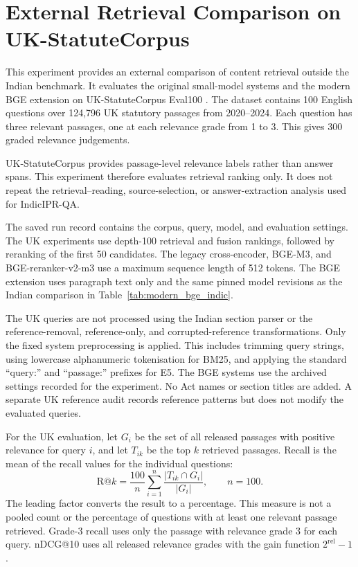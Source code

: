 \documentclass[pdflatex,sn-basic]{sn-jnl}%
\theoremstyle{thmstyleone}%
\theoremstyle{thmstyletwo}%
\theoremstyle{thmstylethree}%
\begin{document}
\FloatBarrier

\section{External Retrieval Comparison on UK-StatuteCorpus}
\label{sec:uk_external_validation}

This experiment provides an external comparison of content retrieval outside
the Indian benchmark. It evaluates the original small-model systems and the
modern BGE extension on UK-StatuteCorpus Eval100
\citep{alshehri2026neural}. The dataset contains 100 English questions over
124,796 UK statutory passages from 2020--2024. Each question has three
relevant passages, one at each relevance grade from 1 to 3. This gives 300
graded relevance judgements.

UK-StatuteCorpus provides passage-level relevance labels rather than answer
spans. This experiment therefore evaluates retrieval ranking only. It does
not repeat the retrieval--reading, source-selection, or answer-extraction
analysis used for IndicIPR-QA.

The saved run record contains the corpus, query, model, and evaluation
settings. The UK experiments use depth-100 retrieval and fusion rankings,
followed by reranking of the first 50 candidates. The legacy cross-encoder,
BGE-M3, and BGE-reranker-v2-m3 use a maximum sequence length of 512 tokens.
The BGE extension uses paragraph text only and the same pinned model revisions
as the Indian comparison in Table~\ref{tab:modern_bge_indic}.

The UK queries are not processed using the Indian section parser or the
reference-removal, reference-only, and corrupted-reference transformations.
Only the fixed system preprocessing is applied. This includes trimming query
strings, using lowercase alphanumeric tokenisation for BM25, and applying
the standard ``query:'' and ``passage:'' prefixes for E5. The BGE systems
use the archived settings recorded for the experiment. No Act names or
section titles are added. A separate UK reference audit records reference
patterns but does not modify the evaluated queries.

For the UK evaluation, let \(G_i\) be the set of all released passages with
positive relevance for query \(i\), and let \(T_{ik}\) be the top \(k\)
retrieved passages. Recall is the mean of the recall values for the individual
questions:
\[
\mathrm{R@}k
=\frac{100}{n}\sum_{i=1}^{n}
\frac{|T_{ik}\cap G_i|}{|G_i|},
\qquad n=100.
\]
The leading factor converts the result to a percentage. This measure is not
a pooled count or the percentage of questions with at least one relevant
passage retrieved. Grade-3 recall uses only the passage with relevance grade
3 for each query. nDCG@10 uses all released relevance grades with the gain
function \(2^{\mathrm{rel}}-1\).
\end{document}
